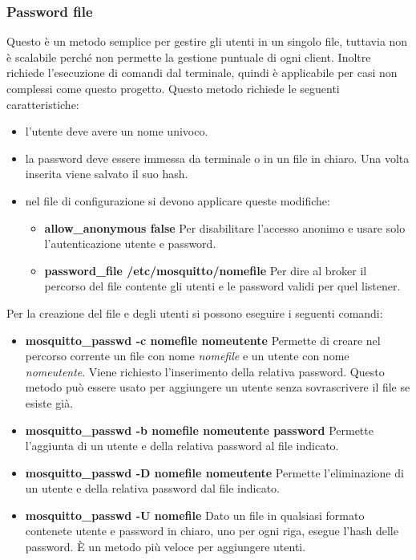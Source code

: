 \subsubsection{Password file}
\label{subsec:broker-password-file}
Questo è un metodo semplice per gestire gli utenti in un singolo file,
tuttavia non è scalabile perché non permette la gestione puntuale di ogni client.
Inoltre richiede l'esecuzione di comandi dal terminale,
quindi è applicabile per casi non complessi come questo progetto.\newline
Questo metodo richiede le seguenti caratteristiche:
\begin{itemize}
    \item l'utente deve avere un nome univoco.
    \item la password deve essere immessa da terminale o in un file in chiaro.
    Una volta inserita viene salvato il suo hash.
    \item nel file di configurazione si devono applicare queste modifiche:
    \begin{itemize}
        \item \textbf{allow\_anonymous false} \newline
        Per disabilitare l'accesso anonimo e usare solo l'autenticazione utente e password.
        \item \textbf{password\_file /etc/mosquitto/nomefile} \newline
        Per dire al broker il percorso del file contente gli utenti e le password validi per quel listener.
    \end{itemize}
\end{itemize}
Per la creazione del file e degli utenti si possono eseguire i seguenti comandi:
\begin{itemize}
    \item \textbf{mosquitto\_passwd -c nomefile nomeutente} \newline
    Permette di creare nel percorso corrente un file con nome \textit{nomefile} e un utente con nome \textit{nomeutente}.
    Viene richiesto l'inserimento della relativa password. Questo metodo può essere usato per aggiungere un utente senza
    sovrascrivere il file se esiste già.
    \item \textbf{mosquitto\_passwd -b nomefile nomeutente password} \newline
    Permette l'aggiunta di un utente e della relativa password al file indicato.
    \item \textbf{mosquitto\_passwd -D nomefile nomeutente} \newline
    Permette l'eliminazione di un utente e della relativa password dal file indicato.
    \item \textbf{mosquitto\_passwd -U nomefile} \newline
    Dato un file in qualsiasi formato contenete utente e password in chiaro, uno per ogni riga,
    esegue l'hash delle password. È un metodo più veloce per aggiungere utenti.
\end{itemize}
